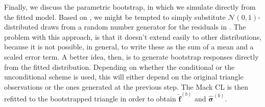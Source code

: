 \documentclass[a4paper]{book}
\begin{document}
Finally, we discuss the parametric bootstrap, in which we simulate directly from the fitted model. Based on , we might be tempted to simply substitute $\mathcal{N}(0, 1)$-distributed draws from a random number generator for the residuals in . The problem with this approach, is that it doesn't extend easily to other distributions, because it is not possible, in general, to write these as the sum of a mean and a scaled error term. A better idea, then, is to generate bootstrap responses directly from the fitted distribution. Depending on whether the conditional or the unconditional scheme is used, this will either depend on the original triangle observations or the ones generated at the previous step. The Mack CL is then refitted to the bootstrapped triangle in order to obtain $\widehat{\bm{f}}^{(b)}$ and $\widehat{\bm{\sigma}}^{(b)}$.
\end{document}
